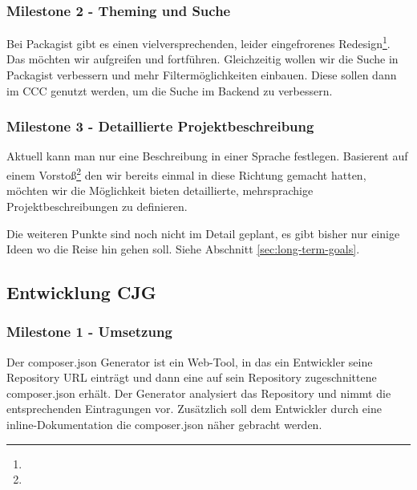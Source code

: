 \documentclass[
paper=a4,
draft=false,%
fontsize=10pt%
]{scrartcl}
\begin{document}
\subsubsection{Milestone 2 - Theming und Suche}
\label{subsec:ccr-milestone-2}

Bei Packagist gibt es einen vielversprechenden, leider eingefrorenes Redesign\footnote{}. Das möchten wir aufgreifen und fortführen. Gleichzeitig wollen wir die Suche in Packagist verbessern und mehr Filtermöglichkeiten einbauen. Diese sollen dann im CCC  genutzt werden, um die Suche im Backend zu verbessern.

\subsubsection{Milestone 3 - Detaillierte Projektbeschreibung}
\label{subsec:ccr-milestone-3}

Aktuell kann man nur eine  Beschreibung in einer Sprache festlegen. Basierent auf einem Vorstoß\footnote{} den wir bereits einmal in diese Richtung gemacht hatten, möchten wir die Möglichkeit bieten detaillierte, mehrsprachige Projektbeschreibungen zu definieren.

\vspace{1cm}

\begin{info}
Die weiteren Punkte sind noch nicht im Detail geplant, es gibt bisher nur einige Ideen wo die Reise hin gehen soll. Siehe Abschnitt \ref{sec:long-term-goals}.
\end{info}

\pagebreak

\subsection{Entwicklung CJG}
\label{subsec:cjg}

\subsubsection{Milestone 1 - Umsetzung}
\label{subsec:cjg-milestone-1}

Der composer.json Generator ist ein Web-Tool, in das ein Entwickler seine Repository URL einträgt und dann eine auf sein Repository zugeschnittene composer.json erhält. Der Generator analysiert das Repository und nimmt die entsprechenden Eintragungen vor. Zusätzlich soll dem Entwickler durch eine inline-Dokumentation die composer.json näher gebracht werden.
\end{document}

